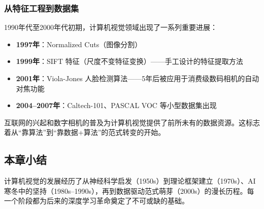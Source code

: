 \subsubsection{从特征工程到数据集}

1990年代至2000年代初期，计算机视觉领域出现了一系列重要进展：

\begin{itemize}
    \item \textbf{1997年}：Normalized Cuts（图像分割）
    \item \textbf{1999年}：SIFT 特征（尺度不变特征变换）——手工设计的特征提取方法
    \item \textbf{2001年}：Viola-Jones 人脸检测算法——5年后被应用于消费级数码相机的自动对焦功能
    \item \textbf{2004--2007年}：Caltech-101、PASCAL VOC 等小型数据集出现
\end{itemize}

互联网的兴起和数字相机的普及为计算机视觉提供了前所未有的数据资源。这标志着从``靠算法''到``靠数据+算法''的范式转变的开始。

\subsection{本章小结}

计算机视觉的发展经历了从神经科学启发（1950s）到理论框架建立（1970s）、AI 寒冬中的坚持（1980s--1990s），再到数据驱动范式萌芽（2000s）的漫长历程。每一个阶段都为后来的深度学习革命奠定了不可或缺的基础。


